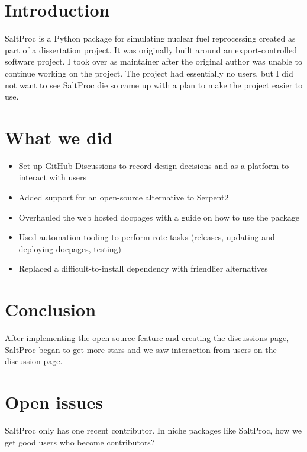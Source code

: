\documentclass[a0paper,fleqn]{betterposter}
\begin{document}
{\section{Introduction}
SaltProc is a Python package for simulating nuclear fuel reprocessing created as part of a dissertation project. It was originally built around an export-controlled software project. I took over as maintainer after the original author was unable to continue working on the project. The project had essentially no users, but I did not want to see SaltProc die so came up with a plan to make the project easier to use.

\vspace{-1cm}
\section{What we did}
\vspace{-2cm}
\begin{itemize}
    \item Set up GitHub Discussions to record design decisions and as a platform to interact with users
    \item Added support for an open-source alternative to Serpent2
    \item Overhauled the web hosted docpages with a guide on how to use the package
    \item Used automation tooling to perform rote tasks (releases, updating and deploying docpages, testing)
    \item Replaced a difficult-to-install dependency with friendlier alternatives
\end{itemize}

\vspace{-1cm}
\section{Conclusion}
After implementing the open source feature and creating the discussions page, SaltProc began to get more stars and we saw interaction from users on the discussion page.

\vspace{-1cm}
\section{Open issues}
SaltProc only has one recent contributor. In niche packages like SaltProc, how we get good users who become contributors?
\vfill

}
\end{document}
